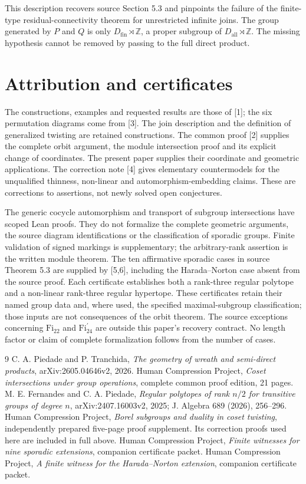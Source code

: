 This description recovers source Section 5.3 and pinpoints the failure
of the finite-type residual-connectivity theorem for unrestricted
infinite joins. The group generated by $P$ and $Q$ is only
$D_{\mathrm{fin}}\rtimes\mathbb Z$, a proper subgroup of
$D_{\mathrm{all}}\rtimes\mathbb Z$. The missing hypothesis cannot
be removed by passing to the full direct product.

\section{Attribution and certificates}
The constructions, examples and requested results are those of [1];
the six permutation diagrams come from [3]. The join description and
the definition of generalized twisting are retained constructions.
The common proof [2] supplies the complete orbit argument, the module
intersection proof and its explicit change of coordinates. The present
paper supplies their coordinate and geometric applications. The
correction note [4] gives elementary countermodels for the unqualified
thinness, non-linear and automorphism-embedding claims. These are
corrections to assertions, not newly solved open conjectures.

The generic cocycle automorphism and transport of subgroup intersections
have scoped Lean proofs. They do not formalize the complete geometric
arguments, the source diagram identifications or the classification of
sporadic groups. Finite validation of signed markings is supplementary;
the arbitrary-rank assertion is the written module theorem. The ten
affirmative sporadic cases in source Theorem 5.3 are supplied by [5,6],
including the Harada--Norton case absent from the source proof. Each
certificate establishes both a rank-three regular polytope and a
non-linear rank-three regular hypertope. These certificates retain their
named group data and, where used, the specified maximal-subgroup
classification; those inputs are not consequences of the orbit theorem.
The source exceptions concerning $\mathrm{Fi}_{22}$ and
$\mathrm{Fi}_{24}^{\prime}$ are outside this paper's recovery contract.
No length factor or claim of complete formalization follows from the
number of cases.

\begin{thebibliography}{9}
 C. A. Piedade and P. Tranchida, \emph{The geometry of wreath and semi-direct products}, arXiv:2605.04646v2, 2026.
 Human Compression Project, \emph{Coset intersections under group operations}, complete common proof edition, 21 pages.
 M. E. Fernandes and C. A. Piedade, \emph{Regular polytopes of rank $n/2$ for transitive groups of degree $n$}, arXiv:2407.16003v2, 2025; J. Algebra 689 (2026), 256--296.
 Human Compression Project, \emph{Borel subgroups and duality in coset twisting}, independently prepared five-page proof supplement. Its correction proofs used here are included in full above.
 Human Compression Project, \emph{Finite witnesses for nine sporadic extensions}, companion certificate packet.
 Human Compression Project, \emph{A finite witness for the Harada--Norton extension}, companion certificate packet.
\end{thebibliography}

